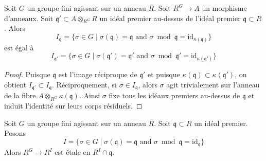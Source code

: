 \begin{lemma}
\label{lemma-inertia-base-change}
Soit $G$ un groupe fini agissant sur un anneau $R$. Soit $R^G \to A$ un morphisme
d'anneaux. Soit $\mathfrak q' \subset A \otimes_{R^G} R$ un idéal premier au-dessus
de l'idéal premier $\mathfrak q \subset R$. Alors
$$
I_\mathfrak q = \{\sigma \in G \mid
\sigma(\mathfrak q) = \mathfrak q\text{ and }
\sigma \bmod \mathfrak q = \text{id}_{\kappa(\mathfrak q)}\}
$$
est égal à
$$
I_{\mathfrak q'} = \{\sigma \in G \mid
\sigma(\mathfrak q') = \mathfrak q'\text{ and }
\sigma \bmod \mathfrak q' = \text{id}_{\kappa(\mathfrak q')}\}
$$
\end{lemma}

\begin{proof}
Puisque $\mathfrak q$ est l'image réciproque de $\mathfrak q'$
et puisque $\kappa(\mathfrak q) \subset \kappa(\mathfrak q')$,
on obtient $I_{\mathfrak q'} \subset I_\mathfrak q$.
Réciproquement, si $\sigma \in I_\mathfrak q$, alors $\sigma$
agit trivialement sur l'anneau de la fibre $A \otimes_{R^G} \kappa(\mathfrak q)$.
Ainsi $\sigma$ fixe tous les idéaux premiers au-dessus de $\mathfrak q$
et induit l'identité sur leurs corps résiduels.
\end{proof}

\begin{lemma}
\label{lemma-inertia-invariants-etale}
Soit $G$ un groupe fini agissant sur un anneau $R$. Soit $\mathfrak q \subset R$
un idéal premier. Posons
$$
I = \{\sigma \in G \mid \sigma(\mathfrak q) = \mathfrak q
\text{ and } \sigma \bmod \mathfrak q = \text{id}_\mathfrak q\}
$$
Alors $R^G \to R^I$ est étale en $R^I \cap \mathfrak q$.
\end{lemma}

